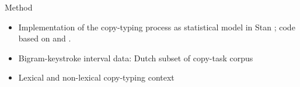 \begin{frame}{Method}

\begin{itemize}
	\item Implementation of the copy-typing process as statistical model in Stan \parencite{carpenter2016stan}; code based on \textcite{sorensen2016bayesian} and \textcite{vasishth2017}.
	\item Bigram-keystroke interval data: Dutch subset of copy-task corpus \parencite{waes2019,van2019multilingual}
	\item Lexical and non-lexical copy-typing context
\end{itemize}

\end{frame}


